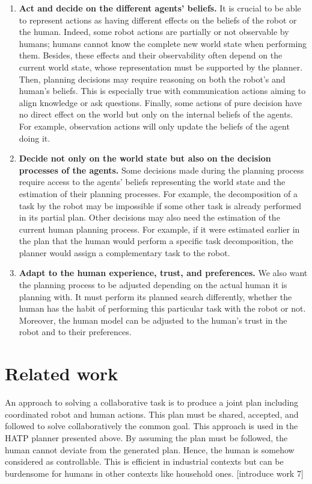 \begin{enumerate}
    \item \textbf{Act and decide on the different agents' beliefs.} It is crucial to be able to represent actions as having different effects on the beliefs of the robot or the human. Indeed, some robot actions are partially or not observable by humans; humans cannot know the complete new world state when performing them. Besides, these effects and their observability often depend on the current world state, whose representation must be supported by the planner. Then, planning decisions may require reasoning on both the robot's and human's beliefs. This is especially true with communication actions aiming to align knowledge or ask questions. Finally, some actions of pure decision have no direct effect on the world but only on the internal beliefs of the agents. For example, observation actions will only update the beliefs of the agent doing it.

    \item \textbf{Decide not only on the world state but also on the decision processes of the agents.} Some decisions made during the planning process require access to the agents' beliefs representing the world state and the estimation of their planning processes. For example, the decomposition of a task by the robot may be impossible if some other task is already performed in its partial plan. Other decisions may also need the estimation of the current human planning process. For example, if it were estimated earlier in the plan that the human would perform a specific task decomposition, the planner would assign a complementary task to the robot.

    \item \textbf{Adapt to the human experience, trust, and preferences.} We also want the planning process to be adjusted depending on the actual human it is planning with. It must perform its planned search differently, whether the human has the habit of performing this particular task with the robot or not. Moreover, the human model can be adjusted to the human's trust in the robot and to their preferences.

\end{enumerate}

\section{Related work} \label{sec:ch2_related_work}

An approach to solving a collaborative task is to produce a joint plan including coordinated robot and human actions. This plan must be shared, accepted, and followed to solve collaboratively the common goal. This approach is used in the HATP planner \cite{alili2009task} presented above. By assuming the plan must be followed, the human cannot deviate from the generated plan. Hence, the human is somehow considered as controllable. This is efficient in industrial contexts but can be burdensome for humans in other contexts like household ones. [introduce work 7]

